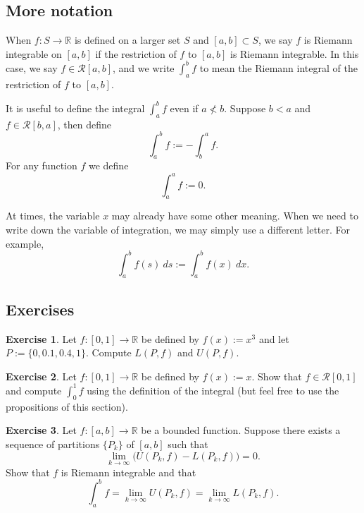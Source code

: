 \documentclass[12pt]{book}
\newcommand{\R}{{\mathbb{R}}}
\newcommand{\sR}{{\mathcal{R}}}
\theoremstyle{plain}
\theoremstyle{remark}
\theoremstyle{definition}
\theoremstyle{exercise}
\newtheorem{exercise}{Exercise}[section]
\theoremstyle{example}
\newcommand{\propref}[1]{\hyperref[#1]{Proposition~\ref*{#1}}}
\begin{document}
\subsection{More notation}

When $f \colon S \to \R$ is defined on a larger set $S$ and
$[a,b] \subset S$,
we say $f$ is Riemann integrable on $[a,b]$ if the restriction of $f$
to $[a,b]$ is Riemann integrable. 
In this case,
we say $f \in \sR[a,b]$,
and
we write $\int_a^b f$ to mean the Riemann integral
of the restriction of $f$ to $[a,b]$.

It is useful to define the integral $\int_a^b f$ even if
$a \not< b$.  Suppose $b < a$ and $f \in \sR[b,a]$,
then define
\begin{equation*}
\int_a^b f := - \int_b^a f .
\end{equation*}
For any function $f$ we define
\begin{equation*}
\int_a^a f := 0 .
\end{equation*}

At times, the variable $x$ may already have some other meaning.  When
we need to write down the variable of integration, we may simply
use a different letter.  For example,
\begin{equation*}
\int_a^b f(s)~ds := \int_a^b f(x)~dx .
\end{equation*}

\subsection{Exercises}

\begin{exercise}
Let $f \colon [0,1] \to \R$ be defined by $f(x) := x^3$
and let $P := \{ 0, 0.1, 0.4, 1 \}$.  Compute $L(P,f)$ and $U(P,f)$.
\end{exercise}

\begin{exercise}
Let $f \colon [0,1] \to \R$ be defined by $f(x) := x$.
Show that $f \in \sR[0,1]$ and
compute $\int_0^1 f$ using the definition of the integral
(but
feel free to use the propositions of this section).%
\end{exercise}

\begin{exercise}
Let $f \colon [a,b] \to \R$ be a bounded function.
Suppose there exists a sequence of partitions $\{ P_k \}$ of $[a,b]$
such that
\begin{equation*}
\lim_{k \to \infty} \bigl( U(P_k,f) - L(P_k,f) \bigr) = 0 .
\end{equation*}
Show that $f$ is Riemann integrable and that
\begin{equation*}
\int_a^b f = 
\lim_{k \to \infty} U(P_k,f)
=
\lim_{k \to \infty} L(P_k,f) .
\end{equation*}
\end{exercise}
\end{document}
